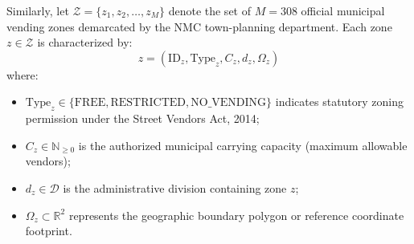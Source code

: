 Similarly, let $\mathcal{Z} = \{z_1, z_2, \dots, z_M\}$ denote the set of $M = 308$ official municipal vending zones demarcated by the NMC town-planning department. Each zone $z \in \mathcal{Z}$ is characterized by:
\begin{equation}
    z = \left( \text{ID}_z, \text{Type}_z, C_z, d_z, \Omega_z \right)
    \label{eq:zone_tuple_def}
\end{equation}
where:
\begin{itemize}
    \item $\text{Type}_z \in \{\text{FREE}, \text{RESTRICTED}, \text{NO\_VENDING}\}$ indicates statutory zoning permission under the Street Vendors Act, 2014;
    \item $C_z \in \mathbb{N}_{\ge 0}$ is the authorized municipal carrying capacity (maximum allowable vendors);
    \item $d_z \in \mathcal{D}$ is the administrative division containing zone $z$;
    \item $\Omega_z \subset \mathbb{R}^2$ represents the geographic boundary polygon or reference coordinate footprint.
\end{itemize}

